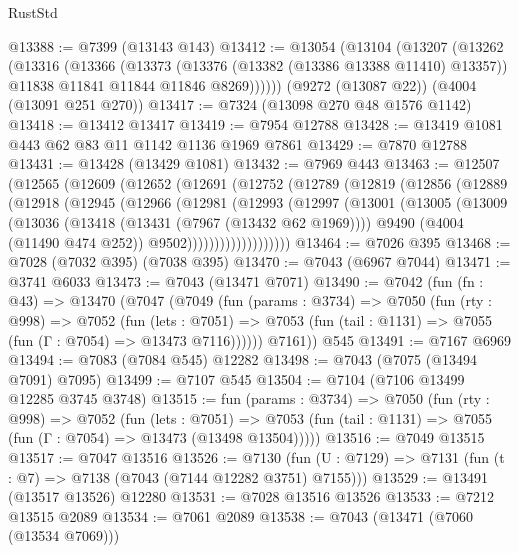 \begin{lexlean}{RustStd}
\begin{coremodule}
@13388 := @7399 (@13143 @143)
@13412 := @13054
    (@13104
      (@13207
        (@13262
          (@13316
            (@13366
              (@13373
                (@13376 (@13382 (@13386 @13388 @11410) @13357))
                @11838
                @11841
                @11844
                @11846
                @8269))))))
    (@9272 (@13087 @22))
    (@4004 (@13091 @251 @270))
@13417 := @7324 (@13098 @270 @48 @1576 @1142)
@13418 := @13412 @13417
@13419 := @7954 @12788
@13428 := @13419 @1081 @443 @62 @83 @11 @1142 @1136 @1969 @7861
@13429 := @7870 @12788
@13431 := @13428 (@13429 @1081)
@13432 := @7969 @443
@13463 := @12507
    (@12565
      (@12609
        (@12652
          (@12691
            (@12752
              (@12789
                (@12819
                  (@12856
                    (@12889
                      (@12918
                        (@12945
                          (@12966
                            (@12981
                              (@12993
                                (@12997
                                  (@13001
                                    (@13005
                                      (@13009
                                        (@13036
                                          (@13418 (@13431 (@7967 (@13432 @62 @1969))))
                                          @9490
                                          (@4004 (@11490 @474 @252))
                                          @9502)))))))))))))))))))
@13464 := @7026 @395
@13468 := @7028 (@7032 @395) (@7038 @395)
@13470 := @7043 (@6967 @7044)
@13471 := @3741 @6033
@13473 := @7043 (@13471 @7071)
@13490 := @7042
    (fun (fn : @43) =>
    @13470
      (@7047
        (@7049
          (fun (params : @3734) =>
          @7050
            (fun (rty : @998) =>
            @7052
              (fun (lets : @7051) =>
              @7053 (fun (tail : @1131) => @7055 (fun (Γ : @7054) => @13473 @7116))))))
        @7161))
    @545
@13491 := @7167 @6969
@13494 := @7083 (@7084 @545) @12282
@13498 := @7043 (@7075 (@13494 @7091) @7095)
@13499 := @7107 @545
@13504 := @7104 (@7106 @13499 @12285 @3745 @3748)
@13515 := fun (params : @3734) =>
  @7050
    (fun (rty : @998) =>
    @7052
      (fun (lets : @7051) =>
      @7053 (fun (tail : @1131) => @7055 (fun (Γ : @7054) => @13473 (@13498 @13504)))))
@13516 := @7049 @13515
@13517 := @7047 @13516
@13526 := @7130
    (fun (U : @7129) => @7131 (fun (t : @7) => @7138 (@7043 (@7144 @12282 @3751) @7155)))
@13529 := @13491 (@13517 @13526) @12280
@13531 := @7028 @13516 @13526
@13533 := @7212 @13515 @2089
@13534 := @7061 @2089
@13538 := @7043 (@13471 (@7060 (@13534 @7069)))

\end{coremodule}
\end{lexlean}
